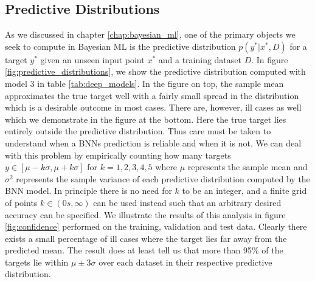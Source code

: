 \subsection{Predictive Distributions}
As we discussed in chapter \ref{chap:bayesian_ml}, one of the primary objects we seek to compute
in Bayesian ML is the predictive distribution $p(y^*|x^*, D)$ for a target $y^*$ given an unseen input point $x^*$ and
a training dataset $D$. In figure \ref{fig:predictive_distributions}, we show the predictive distribution computed with model 3 in table \ref{tab:deep_models}. In the figure on top, the sample mean approximates the true target well with a fairly small spread in the distribution which is a desirable outcome in most cases. There are, however, ill cases as well which we demonstrate in the figure at the bottom. Here the true target lies entirely outside the predictive distribution. Thus care must be taken to understand when a BNNs prediction is reliable and when it is not. We can deal with this problem by empirically counting how many targets $y \in [\mu - k\sigma, \mu + k \sigma]$ for $k = 1, 2, 3, 4, 5$ where $\mu$ represents the sample mean and $\sigma^2$ represents the sample variance of each predictive distribution computed by the BNN model. In principle there is no need for $k$ to be an integer, and a finite grid of points $k \in (0s, \infty)$ can be used instead such that an arbitrary desired accuracy can be specified. We illustrate the results of this analysis in figure \ref{fig:confidence} performed on the training, validation and test data. Clearly there exists a small percentage of ill cases where the target lies far away from the predicted mean. The result does at least tell us that more than 95\% of the targets lie within $\mu \pm 3\sigma$ over each dataset in their respective predictive distribution.
